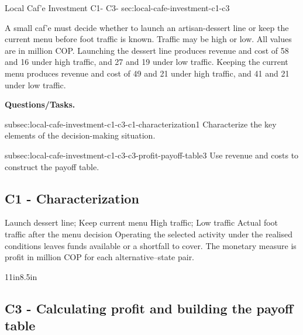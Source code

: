 	\sectionScored
	{Local Caf'e Investment}
	{C1- \hspace{2mm} C3-}
	{sec:local-cafe-investment-c1-c3}
	{
		A small caf'e must decide whether to launch an artisan-dessert line or keep the current menu before foot traffic is known. Traffic may be high or low. All values are in million COP. Launching the dessert line produces revenue and cost of 58 and 16 under high traffic, and 27 and 19 under low traffic. Keeping the current menu produces revenue and cost of 49 and 21 under high traffic, and 41 and 21 under low traffic.
		
		\textbf{Questions/Tasks.}
		\begin{enumerate}
			\CriterionTask
			{subsec:local-cafe-investment-c1-c3-c1-characterization}{1}
			{Characterize the key elements of the decision-making situation. }
			
			\CriterionTask
			{subsec:local-cafe-investment-c1-c3-c3-profit-payoff-table}{3}
			{Use revenue and costs to construct the payoff table. }
		\end{enumerate}
		
		\label{subsec:local-cafe-investment-c1-c3-c1-characterization}
		\subsection*{C1 - Characterization }
		
		\DecisionElementsTable
{Launch dessert line; Keep current menu}
{High traffic; Low traffic}
{Actual foot traffic after the menu decision}
{Operating the selected activity under the realised conditions leaves funds available or a shortfall to cover. The monetary measure is profit in million COP for each alternative--state pair.}

		
		\begin{CalculationLandscape}{11in}{8.5in}
		\label{subsec:local-cafe-investment-c1-c3-c3-profit-payoff-table}
		\subsection*{C3 - Calculating profit and building the payoff table }
		
		


\end{CalculationLandscape}}
